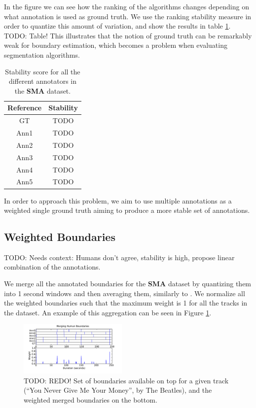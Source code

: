\documentclass{article}
\begin{document}
In the figure we can see how the ranking of the algorithms changes depending on what annotation is used as ground truth.
We use the ranking stability measure in order to quantize this amount of variation, and show the results in table \ref{tab:stability-multipleGT}.
TODO: Table!
This illustrates that the notion of ground truth can be remarkably weak for boundary estimation, which becomes a problem when evaluating segmentation algorithms.

\begin{table}[h]
  \center
  \begin{tabular}{|c|c|}
    \hline
    Reference & Stability \\
    \hline
    GT      & TODO \\
    Ann1    & TODO \\
    Ann2    & TODO \\
    Ann3    & TODO \\
    Ann4    & TODO \\
    Ann5    & TODO \\
    \hline
  \end{tabular}
  \caption{Stability score for all the different annotators in the \textbf{SMA} dataset.}
  \label{tab:stability-multipleGT}
\end{table}


In order to approach this problem, we aim to use multiple annotations as a weighted single ground truth aiming to produce a more stable set of annotations.

\subsection{Weighted Boundaries}

TODO: Needs context: Humans don't agree, stability is high, propose linear combination of the annotations.

We merge all the annotated boundaries for the \textbf{SMA} dataset by quantizing them into 1 second windows and then averaging them, similarly to \cite{Thom2002}.
We normalize all the weighted boundaries such that the maximum weight is 1 for all the tracks in the dataset.
An example of this aggregation can be seen in Figure \ref{fig:merging-bounds}.

\begin{figure}
  \centering
  \includegraphics[width=0.47\textwidth]{plots/merging-bounds.pdf}
  \caption{TODO: REDO! Set of boundaries available on top for a given track (``You Never Give Me Your Money'', by The Beatles), and the weighted merged boundaries on the bottom.}
  \label{fig:merging-bounds}
\end{figure}
\end{document}
